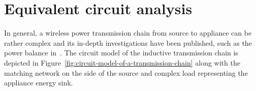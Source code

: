 \documentclass[11pt,a4paper,twoside,openany]{report}
\begin{document}
    \section{Equivalent circuit analysis}

        In general, a wireless power transmission chain from source to appliance can be rather complex and its in-depth investigations have been published, such as the power balance in~\cite{kracek-mazanek:power-balance-of-inductive-wireless-power-transfer}. The circuit model of the inductive transmission chain is depicted in Figure~\ref{fig:circuit-model-of-a-transmission-chain} along with the matching network on the side of the source and complex load representing the appliance energy sink.
        \begin{figure}[!ht]
            \centering
\end{figure}
\end{document}
